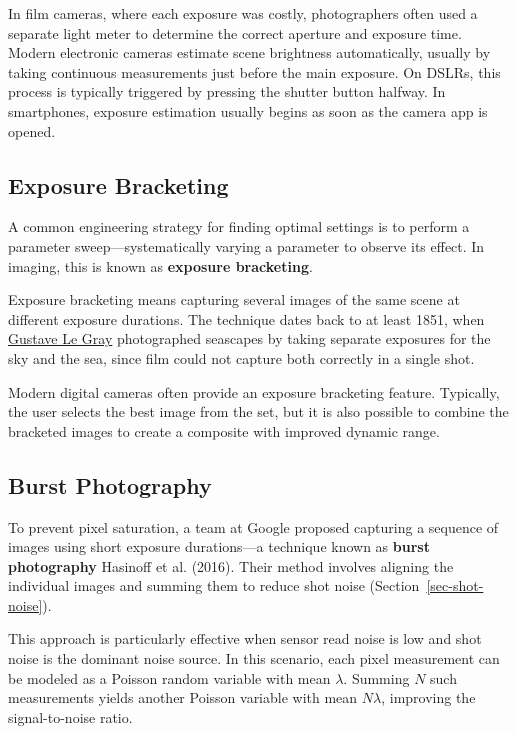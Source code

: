 \documentclass[
  letterpaper,
]{book}
\begin{document}
In film cameras, where each exposure was costly, photographers often
used a separate light meter to determine the correct aperture and
exposure time. Modern electronic cameras estimate scene brightness
automatically, usually by taking continuous measurements just before the
main exposure. On DSLRs, this process is typically triggered by pressing
the shutter button halfway. In smartphones, exposure estimation usually
begins as soon as the camera app is opened.

\subsection{Exposure Bracketing}\label{sec-exposure-bracketing}

A common engineering strategy for finding optimal settings is to perform
a parameter sweep---systematically varying a parameter to observe its
effect. In imaging, this is known as \textbf{exposure bracketing}.

Exposure bracketing means capturing several images of the same scene at
different exposure durations. The technique dates back to at least 1851,
when \href{https://en.wikipedia.org/wiki/Gustave_Le_Gray}{Gustave Le
Gray} photographed seascapes by taking separate exposures for the sky
and the sea, since film could not capture both correctly in a single
shot.

Modern digital cameras often provide an exposure bracketing feature.
Typically, the user selects the best image from the set, but it is also
possible to combine the bracketed images to create a composite with
improved dynamic range.

\subsection{Burst Photography}\label{sec-exposure-burst}

To prevent pixel saturation, a team at Google proposed capturing a
sequence of images using short exposure durations---a technique known as
\textbf{burst photography} Hasinoff et al. (2016). Their method involves
aligning the individual images and summing them to reduce shot noise
(Section~\ref{sec-shot-noise}).

This approach is particularly effective when sensor read noise is low
and shot noise is the dominant noise source. In this scenario, each
pixel measurement can be modeled as a Poisson random variable with mean
\(\lambda\). Summing \(N\) such measurements yields another Poisson
variable with mean \(N\lambda\), improving the signal-to-noise ratio.
\end{document}
